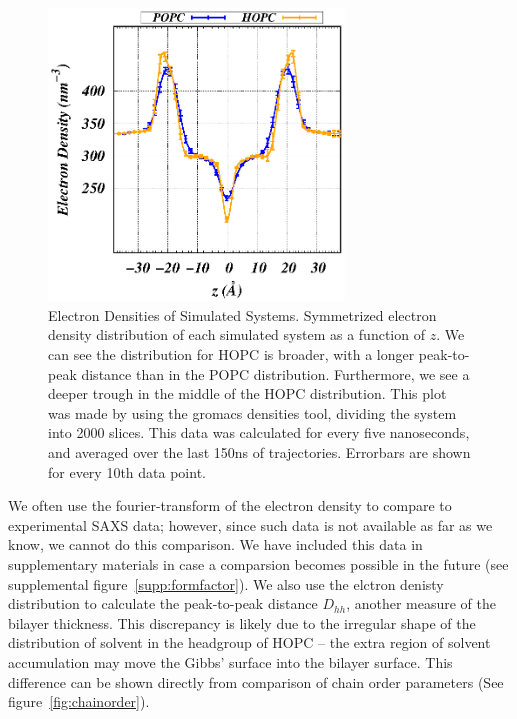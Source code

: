 \documentclass[12pt,preprint,times,openany,draft]{book}
\begin{document}
\begin{figure}[t]
\caption{ 
Electron Densities of Simulated Systems. Symmetrized electron density distribution of each simulated system as a 
function of $z$. We can see the distribution for HOPC 
is broader, with a longer peak-to-peak distance than in the POPC distribution. Furthermore, 
we see a deeper trough in the middle of the HOPC distribution. This plot was made by using the gromacs densities tool, 
dividing the system into 2000 slices. This data was calculated for every five 
nanoseconds, and averaged over the last 150ns of trajectories. Errorbars are shown for every 10th data point.
}
\label{fig:eledens}
\includegraphics[width=	0.7\textwidth]{ele_scattering_density.eps}
\end{figure}
We often use the fourier-transform of the electron density to compare to experimental SAXS data; however, since such data
is not available as far as we know, we cannot do this comparison. We have included this data in supplementary materials in case
a comparsion becomes possible in the future (see supplemental figure~\ref{supp:formfactor}).
We also use the elctron denisty distribution to calculate the peak-to-peak distance $D_{hh}$, another measure of the bilayer thickness.
This discrepancy is likely due to the irregular shape of the distribution of solvent in the headgroup of HOPC -- the extra region 
of solvent accumulation may move the Gibbs' surface into the bilayer surface.
This difference can be shown directly from comparison of chain order 
parameters (See figure~\ref{fig:chainorder}). 
\end{document}
